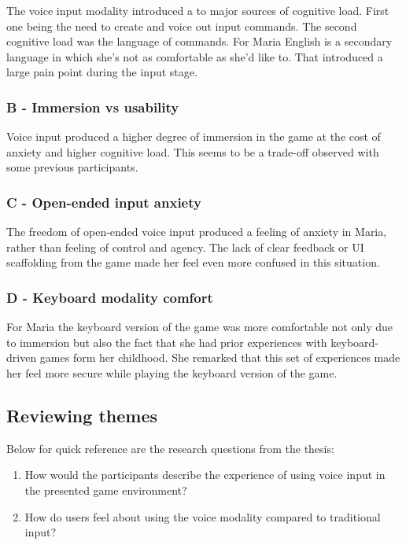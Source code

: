 The voice input modality introduced a to major sources of cognitive load. First one being the need to create and voice out input commands. The second cognitive load was the language of commands. For Maria English is a secondary language in which she's not as comfortable as she'd like to. That introduced a large pain point during the input stage. 

\subsubsection{B - Immersion vs usability}

Voice input produced a higher degree of immersion in the game at the cost of anxiety and higher cognitive load. This seems to be a trade-off observed with some previous participants.


\subsubsection{C - Open-ended input anxiety}

The freedom of open-ended voice input produced a feeling of anxiety in Maria, rather than feeling of control and agency.
The lack of clear feedback or UI scaffolding from the game made her feel even more confused in this situation.


\subsubsection{D - Keyboard modality comfort}

For Maria the keyboard version of the game was more comfortable not only due to immersion but also the fact that she had prior experiences with keyboard-driven games form her childhood. She remarked that this set of experiences made her feel more secure while playing the keyboard version of the game.


\subsection{Reviewing themes}




Below for quick reference are the research questions from the thesis: 

\begin{enumerate}
    \item How would the participants describe the experience of using voice input in the presented
game environment?
    \item How do users feel about using the voice modality compared to traditional input?
\end{enumerate}

